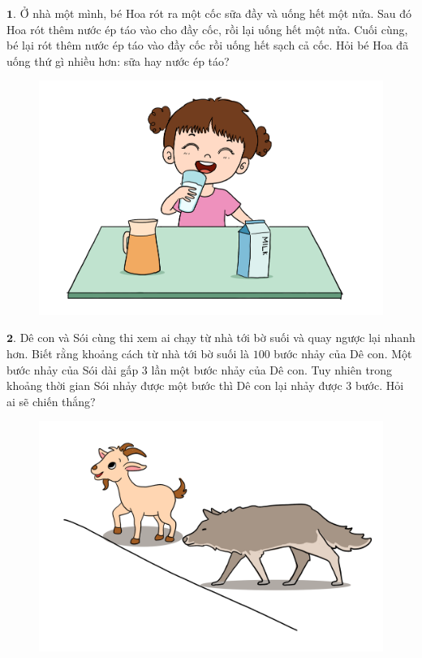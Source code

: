 \begin{multicols}{2}
	$\pmb{1.}$ Ở nhà một mình, bé Hoa rót ra một cốc sữa đầy và uống hết một nửa. Sau đó Hoa rót thêm nước ép táo vào cho đầy cốc, rồi lại uống hết một nửa. Cuối cùng, bé lại rót thêm nước ép táo vào đầy cốc rồi uống hết sạch cả cốc. Hỏi bé Hoa đã uống thứ gì nhiều hơn: sữa hay nước ép táo?
	\begin{figure}[H]
		\centering
		\vspace*{-5pt}
		\captionsetup{labelformat= empty, justification=centering}
		\includegraphics[width=1\linewidth]{Pi6_bai1}
		\vspace*{-15pt}
	\end{figure}
	$\pmb{2.}$ Dê con và Sói cùng thi xem ai chạy từ nhà tới bờ suối và quay ngược lại nhanh hơn. Biết rằng khoảng cách từ nhà tới bờ suối là $100$ bước nhảy của Dê con. Một bước nhảy của Sói dài gấp $3$ lần một bước nhảy của Dê con. Tuy nhiên trong khoảng thời gian Sói nhảy được một bước thì Dê con lại nhảy được $3$ bước. Hỏi ai sẽ chiến thắng?
	\begin{figure}[H]
		\centering
		\vspace*{-5pt}
		\captionsetup{labelformat= empty, justification=centering}
		\includegraphics[width=1\linewidth]{Pi6_bai2}

\end{figure}
\end{multicols}

